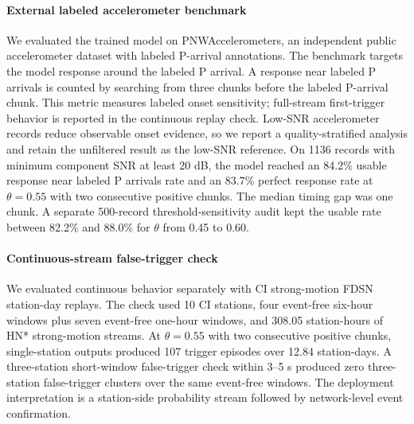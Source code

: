 
\paragraph{External labeled accelerometer benchmark}
We evaluated the trained model on PNWAccelerometers, an independent public accelerometer dataset with labeled P-arrival annotations. The benchmark targets the model response around the labeled P arrival. A response near labeled P arrivals is counted by searching from three chunks before the labeled P-arrival chunk. This metric measures labeled onset sensitivity; full-stream first-trigger behavior is reported in the continuous replay check. Low-SNR accelerometer records reduce observable onset evidence, so we report a quality-stratified analysis and retain the unfiltered result as the low-SNR reference. On 1136 records with minimum component SNR at least 20 dB, the model reached an 84.2\% usable response near labeled P arrivals rate and an 83.7\% perfect response rate at $\theta=0.55$ with two consecutive positive chunks. The median timing gap was one chunk. A separate 500-record threshold-sensitivity audit kept the usable rate between 82.2\% and 88.0\% for $\theta$ from 0.45 to 0.60.

\paragraph{Continuous-stream false-trigger check}
We evaluated continuous behavior separately with CI strong-motion FDSN station-day replays. The check used 10 CI stations, four event-free six-hour windows plus seven event-free one-hour windows, and 308.05 station-hours of HN* strong-motion streams. At $\theta=0.55$ with two consecutive positive chunks, single-station outputs produced 107 trigger episodes over 12.84 station-days. A three-station short-window false-trigger check within 3--5 s produced zero three-station false-trigger clusters over the same event-free windows. The deployment interpretation is a station-side probability stream followed by network-level event confirmation.


